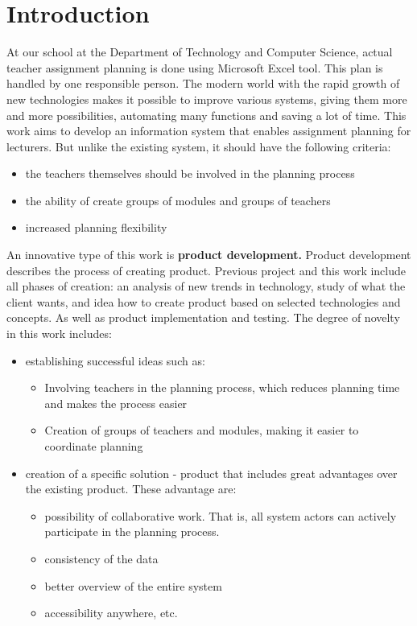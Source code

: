 \documentclass{scrartcl}
\begin{document}
\setcounter{secnumdepth}{2}  %



\section{Introduction}
At our school at the Department of Technology and Computer Science, actual teacher assignment planning is done using Microsoft Excel tool.
This plan is handled by one responsible person.
The modern world with the rapid growth of new technologies makes it possible to improve various systems, giving them more and more possibilities, automating many functions and saving a lot of time.
This work aims to develop an information system that enables assignment planning for lecturers. But unlike the existing system, it should have the following criteria:
\begin{itemize}
\item the teachers themselves should be involved in the planning process
\item the ability of create groups of modules and groups of teachers
\item increased planning flexibility
\end{itemize}
An innovative type of this work is \textbf{product development.} Product development describes the process of creating product. 
Previous project  and this work include all phases of creation: an analysis of new trends in technology, study of what the client wants,  and idea how to create product based on selected technologies and concepts. As well as product implementation and testing. \cite{innovation}
The  degree of novelty in this work includes:
\begin{itemize}
\item establishing successful ideas such as: 
    \begin{itemize}
    \item Involving teachers in the planning process, which reduces planning time and makes the process easier
    \item Creation of groups of teachers and modules, making it easier to coordinate planning
    \end{itemize}
 \item creation of a specific solution -  product that includes great advantages over the existing product. These advantage are:
    \begin{itemize}
        \item possibility of collaborative work. That is, all system actors can actively participate in the planning process.
        \item consistency of the data
        \item better overview of the entire system
        \item accessibility anywhere, etc.
    \end{itemize}
\end{itemize}
\end{document}
